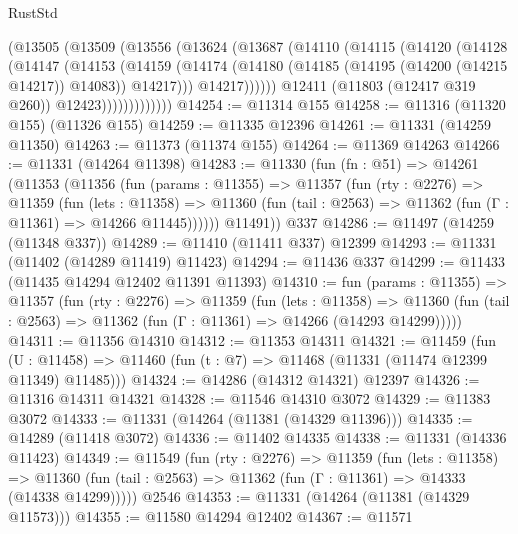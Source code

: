 \begin{lexlean}{RustStd}
\begin{coremodule}
                    (@13505
                      (@13509
                        (@13556
                          (@13624
                            (@13687
                              (@14110
                                (@14115
                                  (@14120
                                    (@14128
                                      (@14147
                                        (@14153
                                          (@14159
                                            (@14174
                                              (@14180
                                                (@14185 (@14195 (@14200 (@14215 @14217)) @14083))
                                                @14217)))
                                          @14217))))))
                              @12411
                              (@11803 (@12417 @319 @260))
                              @12423)))))))))))))
@14254 := @11314 @155
@14258 := @11316 (@11320 @155) (@11326 @155)
@14259 := @11335 @12396
@14261 := @11331 (@14259 @11350)
@14263 := @11373 (@11374 @155)
@14264 := @11369 @14263
@14266 := @11331 (@14264 @11398)
@14283 := @11330
    (fun (fn : @51) =>
    @14261
      (@11353
        (@11356
          (fun (params : @11355) =>
          @11357
            (fun (rty : @2276) =>
            @11359
              (fun (lets : @11358) =>
              @11360 (fun (tail : @2563) => @11362 (fun (Γ : @11361) => @14266 @11445))))))
        @11491))
    @337
@14286 := @11497 (@14259 (@11348 @337))
@14289 := @11410 (@11411 @337) @12399
@14293 := @11331 (@11402 (@14289 @11419) @11423)
@14294 := @11436 @337
@14299 := @11433 (@11435 @14294 @12402 @11391 @11393)
@14310 := fun (params : @11355) =>
  @11357
    (fun (rty : @2276) =>
    @11359
      (fun (lets : @11358) =>
      @11360 (fun (tail : @2563) => @11362 (fun (Γ : @11361) => @14266 (@14293 @14299)))))
@14311 := @11356 @14310
@14312 := @11353 @14311
@14321 := @11459
    (fun (U : @11458) => @11460 (fun (t : @7) => @11468 (@11331 (@11474 @12399 @11349) @11485)))
@14324 := @14286 (@14312 @14321) @12397
@14326 := @11316 @14311 @14321
@14328 := @11546 @14310 @3072
@14329 := @11383 @3072
@14333 := @11331 (@14264 (@11381 (@14329 @11396)))
@14335 := @14289 (@11418 @3072)
@14336 := @11402 @14335
@14338 := @11331 (@14336 @11423)
@14349 := @11549
    (fun (rty : @2276) =>
    @11359
      (fun (lets : @11358) =>
      @11360 (fun (tail : @2563) => @11362 (fun (Γ : @11361) => @14333 (@14338 @14299)))))
    @2546
@14353 := @11331 (@14264 (@11381 (@14329 @11573)))
@14355 := @11580 @14294 @12402
@14367 := @11571

\end{coremodule}
\end{lexlean}

